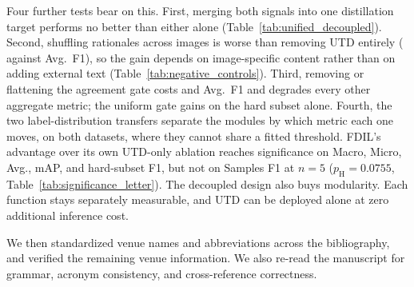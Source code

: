 { Four further tests bear on this. First, merging both signals into one distillation target performs no better than either alone (Table~\ref{tab:unified_decoupled}). Second, shuffling rationales across images is worse than removing UTD entirely ( against  Avg.\ F1), so the gain depends on image-specific content rather than on adding external text (Table~\ref{tab:negative_controls}). Third, removing or flattening the agreement gate costs  and  Avg.\ F1 and degrades every other aggregate metric; the uniform gate gains  on the hard subset alone. Fourth, the two label-distribution transfers separate the modules by which metric each one moves, on both datasets, where they cannot share a fitted threshold. FDIL's advantage over its own UTD-only ablation reaches significance on Macro, Micro, Avg., mAP, and hard-subset F1, but not on Samples F1 at $n=5$ ($p_{\mathrm H}=0.0755$, Table~\ref{tab:significance_letter}). The decoupled design also buys modularity. Each function stays separately measurable, and UTD can be deployed alone at zero additional inference cost.

}
\showUnifiedDecoupled
\showNegativeControls

{

We then standardized venue names and abbreviations across the bibliography, and verified the remaining venue information. We also re-read the manuscript for grammar, acronym consistency, and cross-reference correctness.
}
